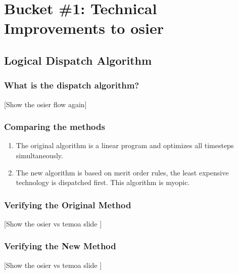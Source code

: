 \section{Bucket \#1: Technical Improvements to \gls{osier}}

\subsection{Logical Dispatch Algorithm}
\begin{frame}
    \frametitle{What is the dispatch algorithm?}

    [Show the osier flow again]

\end{frame}


\begin{frame}
    \frametitle{Comparing the methods}

    \begin{enumerate}
        \item The original algorithm is a linear program and optimizes all
        timesteps simultaneously.
        \item The new algorithm is based on merit order rules, the least
        expensive technology is dispatched first. This algorithm is myopic.
    \end{enumerate}
    
\end{frame}

\begin{frame}
    \frametitle{Verifying the Original Method}

    [Show the osier vs temoa slide ]

\end{frame}

\begin{frame}
    \frametitle{Verifying the New Method}

    [Show the osier vs temoa slide ]

\end{frame}